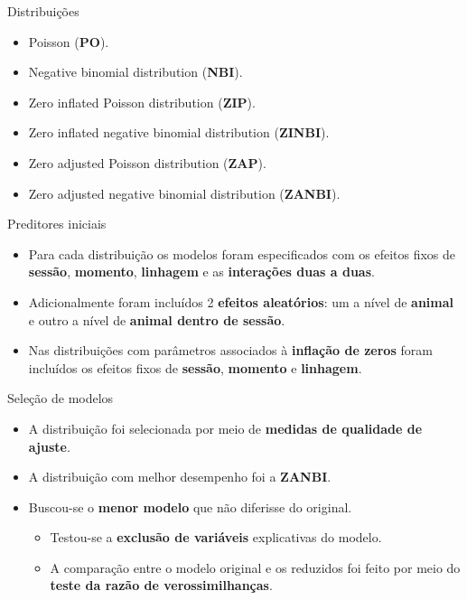 \documentclass[
  ignorenonframetext,
  serif,
  professionalfont,
  usenames,
  dvipsnames,
  aspectratio = 169]{beamer}
\providecommand{\tightlist}{%
  \setlength{\itemsep}{0pt}\setlength{\parskip}{0pt}}
\renewcommand{\tightlist}{%
  \setlength{\itemsep}{0\baselineskip}
  \setlength{\parskip}{0.25\baselineskip}
}
\begin{document}
\begin{frame}{Distribuições}
\protect\hypertarget{distribuiuxe7uxf5es}{}
\begin{itemize}
\tightlist
\item
  Poisson (\textbf{PO}).
\item
  Negative binomial distribution (\textbf{NBI}).
\item
  Zero inflated Poisson distribution (\textbf{ZIP}).
\item
  Zero inflated negative binomial distribution (\textbf{ZINBI}).
\item
  Zero adjusted Poisson distribution (\textbf{ZAP}).
\item
  Zero adjusted negative binomial distribution (\textbf{ZANBI}).
\end{itemize}
\end{frame}

\begin{frame}{Preditores iniciais}
\protect\hypertarget{preditores-iniciais}{}
\begin{itemize}
\item
  Para cada distribuição os modelos foram especificados com os efeitos
  fixos de \textbf{sessão}, \textbf{momento}, \textbf{linhagem} e as
  \textbf{interações duas a duas}.
\item
  Adicionalmente foram incluídos 2 \textbf{efeitos aleatórios}: um a
  nível de \textbf{animal} e outro a nível de
  \textbf{animal dentro de sessão}.
\item
  Nas distribuições com parâmetros associados à
  \textbf{inflação de zeros} foram incluídos os efeitos fixos de
  \textbf{sessão}, \textbf{momento} e \textbf{linhagem}.
\end{itemize}
\end{frame}

\begin{frame}{Seleção de modelos}
\protect\hypertarget{seleuxe7uxe3o-de-modelos}{}
\begin{itemize}
\item
  A distribuição foi selecionada por meio de
  \textbf{medidas de qualidade de ajuste}.
\item
  A distribuição com melhor desempenho foi a \textbf{ZANBI}.
\item
  Buscou-se o \textbf{menor modelo} que não diferisse do original.

  \begin{itemize}
  \tightlist
  \item
    Testou-se a \textbf{exclusão de variáveis} explicativas do modelo.
  \item
    A comparação entre o modelo original e os reduzidos foi feito por
    meio do \textbf{teste da razão de verossimilhanças}.
  \end{itemize}
\end{itemize}
\end{frame}
\end{document}
